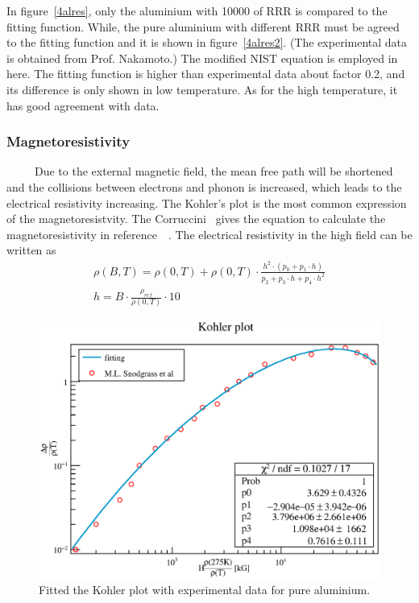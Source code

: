 In figure~\ref{4alres}, only the aluminium with 10000 of RRR is compared to the fitting function.
While, the pure aluminium with different RRR must be agreed to the fitting function and it is shown in figure~\ref{4alres2}.
(The experimental data is obtained from Prof. Nakamoto.)
The modified NIST equation is employed in here.
The fitting function is higher than experimental data about factor 0.2, and its difference is only shown in low temperature.
As for the high temperature, it has good agreement with data.

  \subsubsection{Magnetoresistivity}
~~~~~Due to the external magnetic field, the mean free path will be shortened and the collisions between electrons and phonon is increased, which leads to the electrical resistivity increasing.
The Kohler's plot is the most common expression of the magnetoresistvity.
The Corruccini~\cite{corr} gives the equation to calculate the magnetoresistivity in reference~\cite{fick}~\cite{arp}.
The electrical resistivity in the high field can be written as
\begin{gather}
 \rho(B, T) = \rho(0, T) + \rho(0, T) \cdot \frac{h^2 \cdot (p_0 + p_1 \cdot h)}{p_2 + p_3\cdot h + p_4 \cdot h^2} \\
 h = B \cdot \frac{\rho_{ref}}{\rho(0, T)} \cdot 10
\end{gather}
\begin{figure}[H]
 \centering
 \includegraphics[scale=0.45]{chapter5/fig/Magnetores.eps}
 \caption{Fitted the Kohler plot with experimental data for pure aluminium.}
 \label{4magres}
\end{figure}

